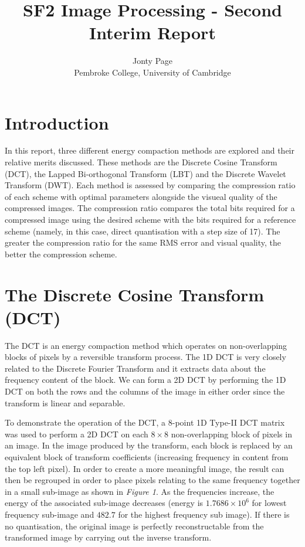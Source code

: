 \documentclass{article}					%
\title{SF2 Image Processing - Second Interim Report}
\author{Jonty Page\\ Pembroke College, University of Cambridge}
\begin{document}
\maketitle
\section{Introduction}
In this report, three different energy compaction methods are explored and their relative merits discussed. These methods are the Discrete Cosine Transform (DCT), the Lapped Bi-orthogonal Transform (LBT) and the Discrete Wavelet Transform (DWT). Each method is assessed by comparing the compression ratio of each scheme with optimal parameters alongside the visueal quality of the compressed images. The compression ratio compares the total bits required for a compressed image using the desired scheme with the bits required for a reference scheme (namely, in this case, direct quantisation with a step size of 17). The greater the compression ratio for the same RMS error and visual quality, the better the compression scheme.
\section{The Discrete Cosine Transform (DCT)}
The DCT is an energy compaction method which operates on non-overlapping blocks of pixels by a reversible transform process.  The 1D DCT is very closely related to the Discrete Fourier Transform and it extracts data about the frequency content of the block. We can form a 2D DCT by performing the 1D DCT on both the rows and the columns of the image in either order since the transform is linear and separable.

To demonstrate the operation of the DCT, a 8-point 1D Type-II DCT matrix was used to perform a 2D DCT on each $8\times 8$ non-overlapping block of pixels in an image. In the image produced by the transform, each block is replaced by an equivalent block of transform coefficients (increasing frequency in content from the top left pixel). In order to create a more meaningful image, the result can then be regrouped in order to place pixels relating to the same frequency together in a small sub-image as shown in \textit{Figure 1}. As the frequencies increase, the energy of the associated sub-image decreases (energy is $1.7686\times 10^6$ for lowest frequency sub-image and $482.7$ for the highest frequency sub image). If there is no quantisation, the original image is perfectly reconstructable from the transformed image by carrying out the inverse transform.
\end{document}
